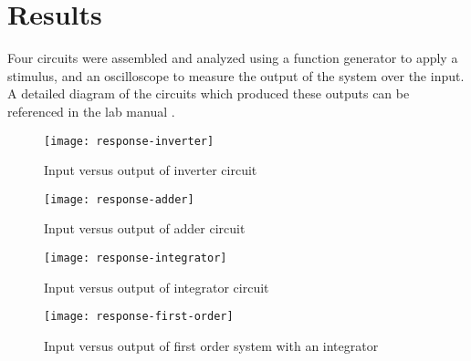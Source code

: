 \section{Results}\label{sec:results}
Four circuits were assembled and analyzed using a function generator to apply a stimulus, and an oscilloscope to measure the output of the system over the input. A detailed diagram of the circuits which produced these outputs can be referenced in the lab manual \cite{lab-manual}.
\begin{figure}[htbp]
	\centering
	\texttt{[image: response-inverter]}
	\label{fig:inverter}
	\caption{Input versus output of inverter circuit}
\end{figure}

\begin{figure}[htbp]
	\centering
	\texttt{[image: response-adder]}
	\label{fig:adder}
	\caption{Input versus output of adder circuit}
\end{figure}

\begin{figure}[htbp]
	\centering
	\texttt{[image: response-integrator]}
	\label{fig:integrator}
	\caption{Input versus output of integrator circuit}
\end{figure}

\begin{figure}
	\centering
	\texttt{[image: response-first-order]}
	\label{fig:first-order}
	\caption{Input versus output of first order system with an integrator}
\end{figure}

\clearpage
